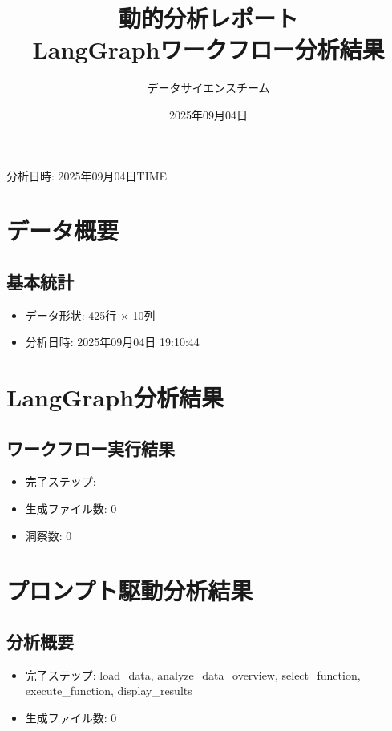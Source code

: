 \documentclass[11pt,a4paper]{article}
\title{\textbf{動的分析レポート} \\ LangGraphワークフロー分析結果}
\author{データサイエンスチーム}
\date{2025年09月04日}
\begin{document}
\maketitle

\vspace{-1cm}
\begin{center}
\large{分析日時: 2025年09月04日TIME}
\end{center}

\tableofcontents
\newpage


\section{データ概要}
\subsection{基本統計}
\begin{itemize}
\item データ形状: 425行 × 10列
\item 分析日時: 2025年09月04日 19:10:44
\end{itemize}


\section{LangGraph分析結果}
\subsection{ワークフロー実行結果}
\begin{itemize}
\item 完了ステップ: 
\item 生成ファイル数: 0
\item 洞察数: 0
\end{itemize}


\section{プロンプト駆動分析結果}
\subsection{分析概要}
\begin{itemize}
\item 完了ステップ: load_data, analyze_data_overview, select_function, execute_function, display_results
\item 生成ファイル数: 0
\end{itemize}
\end{document}
